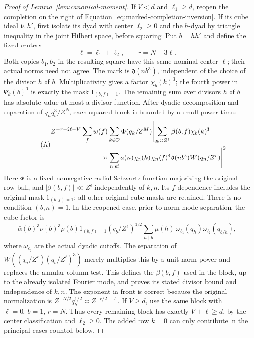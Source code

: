 \documentclass[12pt]{article}
\begin{document}
\begin{proof}[Proof of Lemma~\ref{lem:canonical-moment}]
If \(V<d\) and \(\ell_1\ge d\), reopen the completion on the right of
Equation~\eqref{eq:marked-completion-inversion}.  If its cube ideal is
\(h'\), first isolate its dyad with center \(\ell_2\ge0\) and the
\(h\)-dyad by triangle inequality in the joint Hilbert space, before
squaring.  Put \(b=hh'\) and define the fixed centers
\[
 \ell=\ell_1+\ell_2,\qquad r=N-3\ell.
\]
Both copies \(b_1,b_2\) in the resulting square have this same nominal
center \(\ell\); their actual norms need not agree.  The mark is
\(\mathfrak d(nb^3)\), independent of the
choice of the divisor \(h\) of \(b\).  Multiplicativity gives a factor
\(\chi_b(k)^3\); the fourth power in \(\Psi_k(b)^3\) is exactly the
mask \(1_{(b,f)=1}\).  The remaining sum over divisors \(h\) of \(b\)
has absolute value at most a divisor function.  After dyadic
decomposition and separation of \(q_nq_b^3/Z^N\), each squared block
is bounded by a small power times
\begin{equation}\tag{A}\label{eq:canonical-block}
 \begin{split}
 &Z^{-r-2\ell-V}\sum_f w(f)\sum_{k\in\mathcal O}\Phi(q_k/Z^M)
 \Biggl|\sum_{q_b\asymp Z^\ell}\beta(b,f)\chi_b(k)^3\\
 &\hspace{26mm}\times
       \sum_{n\ {\rm sf}}a(n)\chi_n(k)\chi_n(f)^4
       \mathfrak d(nb^3)W(q_n/Z^r)\Biggr|^2 .
 \end{split}
\end{equation}
Here \(\Phi\) is a fixed nonnegative radial Schwartz function
majorizing the original row ball, and
\(|\beta(b,f)|\ll Z^\epsilon\) independently of \(k,n\).  Its
\(f\)-dependence includes the original mask \(1_{(b,f)=1}\);
all other original cube masks are retained.  There is no condition
\((b,n)=1\).  In the reopened case, prior to norm-mode separation,
the cube factor is
\[
 \bar\alpha(b)^3\nu(b)^3\rho(b)1_{(b,f)=1}
       (q_b/Z^\ell)^{1/2}
 \sum_{h\mid b}\mu(h)\,\omega_{\ell_1}(q_h)
                         \omega_{\ell_2}(q_{b/h}),
\]
where \(\omega_{\ell_j}\) are the actual dyadic cutoffs.
The separation of \(W((q_n/Z^r)(q_b/Z^\ell)^3)\) merely
multiplies this by a unit norm power and replaces the annular
column test.  This defines the \(\beta(b,f)\) used in the block,
up to the already isolated Fourier mode, and proves its stated
divisor bound and independence of \(k,n\).  The exponent in front is correct because the original
normalization is \(Z^{-N/2}q_b^{1/2}\asymp Z^{-r/2-\ell}\).
If \(V\ge d\), use the same block with \(\ell=0,\ b=1,\ r=N\).
Thus every remaining block has exactly \(V+\ell\ge d\), by the center
classification and \(\ell_2\ge0\).  The added row \(k=0\)
can only contribute in the principal cases counted below.


\end{proof}
\end{document}
